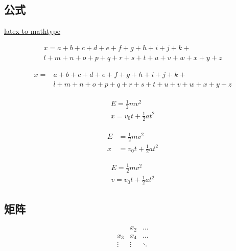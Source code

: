 \documentclass[12pt]{ctexart} %
\begin{document}
\subsection{公式}
\href{https://www.mathtype.cn/jiqiao/gongshi-daima.html}{latex to mathtype}

\begin{multline}%
x=a+b+c+d+e+f+g+h+i+j+k+\\ l+m+n+o+p+q+r+s+t+u+v+w+x+y+z
\end{multline} %

\begin{equation}
    \begin{split}%
    x=&a+b+c+d+e+f+g+h+i+j+k+\\ &l+m+n+o+p+q+r+s+t+u+v+w+x+y+z
    \end{split}
\end{equation}

\begin{align}%
    \begin{aligned}
        E = \frac{1}{2}mv^2 \\
        x = v_{0}t + \frac{1}{2}at^{2}
    \end{aligned}
\end{align}

\begin{align}%
        E &= \frac{1}{2}mv^2 \\
        x &= v_{0}t + \frac{1}{2}at^{2}
\end{align}

\begin{gather}%
    E = \frac{1}{2}mv^2 \\
    v = v_{0}t + \frac{1}{2}at^{2}
\end{gather}

\subsection{矩阵}
\[\begin{array}{ccc}
~ & x_2 & \dots \\
x_3 & x_4 & \dots \\
\vdots & \vdots & \ddots \\
\end{array}\]
\end{document}

